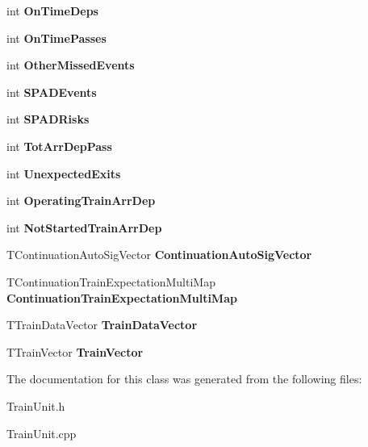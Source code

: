 \begin{DoxyCompactItemize}
int {\bfseries On\+Time\+Deps}
\item 
\mbox{\label{class_t_train_controller_a3498a167993b7da117ec243defb56ab4}} 
int {\bfseries On\+Time\+Passes}
\item 
\mbox{\label{class_t_train_controller_ac4449f3490e36190d510f6960191ce45}} 
int {\bfseries Other\+Missed\+Events}
\item 
\mbox{\label{class_t_train_controller_a273080615512d3a32b82a881af9dc5fb}} 
int {\bfseries S\+P\+A\+D\+Events}
\item 
\mbox{\label{class_t_train_controller_a5d93cb7e73c061071656b8fbd6bbfc72}} 
int {\bfseries S\+P\+A\+D\+Risks}
\item 
\mbox{\label{class_t_train_controller_a6bfae23b356d4450b4d93d863d876f57}} 
int {\bfseries Tot\+Arr\+Dep\+Pass}
\item 
\mbox{\label{class_t_train_controller_af64a32b0811b647196f8d25ac6701ddc}} 
int {\bfseries Unexpected\+Exits}
\item 
\mbox{\label{class_t_train_controller_a9b419c5f86d0815c35093bf3c25c6821}} 
int {\bfseries Operating\+Train\+Arr\+Dep}
\item 
\mbox{\label{class_t_train_controller_aa547b8fba4e19683055e67359d41a933}} 
int {\bfseries Not\+Started\+Train\+Arr\+Dep}
\item 
\mbox{\label{class_t_train_controller_a0b412f7b88f829632e54bffc0659ac3b}} 
T\+Continuation\+Auto\+Sig\+Vector {\bfseries Continuation\+Auto\+Sig\+Vector}
\item 
\mbox{\label{class_t_train_controller_a1a8e542193d93581e0c391d8e7fa3e1b}} 
T\+Continuation\+Train\+Expectation\+Multi\+Map {\bfseries Continuation\+Train\+Expectation\+Multi\+Map}
\item 
\mbox{\label{class_t_train_controller_a4e9c9e646d13f9b952434abcd97cec1b}} 
T\+Train\+Data\+Vector {\bfseries Train\+Data\+Vector}
\item 
\mbox{\label{class_t_train_controller_a694986ff09f8a037b8bce849e40ac119}} 
T\+Train\+Vector {\bfseries Train\+Vector}
\end{DoxyCompactItemize}


The documentation for this class was generated from the following files\+:\begin{DoxyCompactItemize}
\item 
Train\+Unit.\+h\item 
Train\+Unit.\+cpp\end{DoxyCompactItemize}
